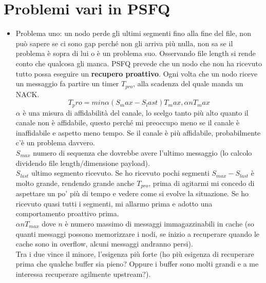 \documentclass[12pt,italian]{report}
\begin{document}
\section{Problemi vari in PSFQ}
\begin{itemize}
    \item Problema uno: un nodo perde gli ultimi segmenti fino alla fine del file, non può sapere se ci sono gap perché non gli arriva più nulla, non sa se il problema è sopra di lui o è un problema suo. Osservando file length si rende conto che qualcosa gli manca. PSFQ prevede che un nodo che non ha ricevuto tutto possa eseguire un \textbf{recupero proattivo}. Ogni volta che un nodo riceve un messaggio fa partire un timer $T_{pro}$, alla scadenza del quale manda un NACK. 
    \begin{equation}
        T_pro = min{\alpha (S_max - S_last) T_max, \alpha n T_max} 
    \end{equation}
    $\alpha$ è una misura di affidabilità del canale, lo scelgo tanto più alto quanto il canale non è affidabile, questo perché mi preoccupo meno se il canale è inaffidabile e aspetto meno tempo. Se il canale è più affidabile, probabilmente c'è un problema davvero. \\ $S_{max}$ numero di sequenza che dovrebbe avere l'ultimo messaggio (lo calcolo dividendo file length/dimensione payload). \\$S_{last}$ ultimo segmento ricevuto. Se ho ricevuto pochi segmenti $S_{max} - S_{last}$ è molto grande, rendendo grande anche $T_{pro}$, prima di agitarmi mi concedo di aspettare un po' più di tempo e vedere come si evolve la situazione. Se ho ricevuto quasi tutti i segmenti, mi allarmo prima e adotto una comportamento proattivo prima. \\ $\alpha n T_{max}$ dove $n$ è numero massimo di messaggi immagazzinabili in cache (so quanti messaggi possono memorizzare i nodi, se inizio a recuperare quando le cache sono in overflow, alcuni messaggi andranno persi). \\ Tra i due vince il minore, l'esigenza più forte (ho più esigenza di recuperare prima che qualche buffer sia pieno? Oppure i buffer sono molti grandi e a me interessa recuperare agilmente upstream?). 
    

\end{itemize}
\end{document}
